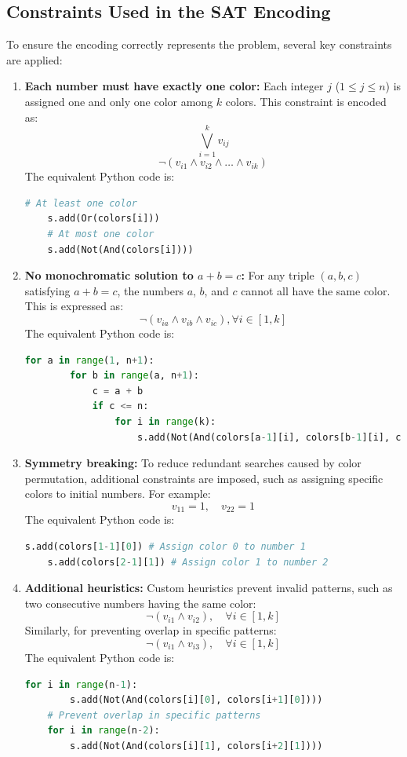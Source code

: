 \documentclass[12pt]{article}
\begin{document}
\subsection{Constraints Used in the SAT Encoding}
To ensure the encoding correctly represents the problem, several key constraints are applied:

\begin{enumerate}
    \item \textbf{Each number must have exactly one color:}
    Each integer \( j \) (\( 1 \leq j \leq n \)) is assigned one and only one color among \( k \) colors. This constraint is encoded as:
    \[
    \bigvee_{i=1}^{k} v_{ij}
    \]
    \[
    \neg(v_{i1} \land v_{i2} \land \ldots \land v_{ik})
    \]
    The equivalent Python code is:
    \begin{lstlisting}[language=Python]
    # At least one color
    s.add(Or(colors[i]))
    # At most one color
    s.add(Not(And(colors[i])))
    \end{lstlisting}

    \item \textbf{No monochromatic solution to \( a + b = c \):}
    For any triple \( (a, b, c) \) satisfying \( a + b = c \), the numbers \( a \), \( b \), and \( c \) cannot all have the same color. This is expressed as:
    \[
    \neg(v_{ia} \land v_{ib} \land v_{ic}), \forall i \in [1, k]
    \]
    The equivalent Python code is:
    \begin{lstlisting}[language=Python]
    for a in range(1, n+1):
        for b in range(a, n+1):
            c = a + b
            if c <= n:
                for i in range(k):
                    s.add(Not(And(colors[a-1][i], colors[b-1][i], colors[c-1][i])))
    \end{lstlisting}

    \item \textbf{Symmetry breaking:}
    To reduce redundant searches caused by color permutation, additional constraints are imposed, such as assigning specific colors to initial numbers. For example:
    \[
    v_{11} = 1, \quad v_{22} = 1
    \]
    The equivalent Python code is:
    \begin{lstlisting}[language=Python]
    s.add(colors[1-1][0]) # Assign color 0 to number 1
    s.add(colors[2-1][1]) # Assign color 1 to number 2
    \end{lstlisting}

    \item \textbf{Additional heuristics:}
    Custom heuristics prevent invalid patterns, such as two consecutive numbers having the same color:
    \[
    \neg(v_{i1} \land v_{i2}), \quad \forall i \in [1, k]
    \]
    Similarly, for preventing overlap in specific patterns:
    \[
    \neg(v_{i1} \land v_{i3}), \quad \forall i \in [1, k]
    \]
    The equivalent Python code is:
    \begin{lstlisting}[language=Python]
    for i in range(n-1):
        s.add(Not(And(colors[i][0], colors[i+1][0])))
    # Prevent overlap in specific patterns
    for i in range(n-2):
        s.add(Not(And(colors[i][1], colors[i+2][1])))
    \end{lstlisting}
\end{enumerate}
\end{document}
